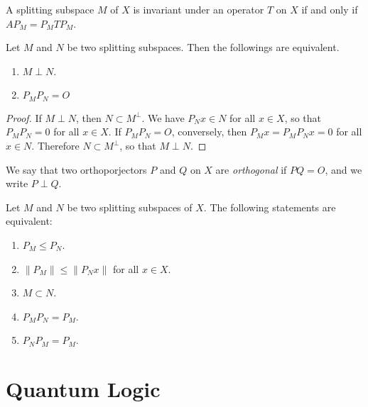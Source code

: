 \begin{lemma}
A splitting subspace \(M\) of \(X\) is invariant under an operator \(T\) on \(X\) if and only if \(AP_M=P_MTP_M\).
\end{lemma}
\begin{lemma}
Let \(M\) and \(N\) be two splitting subspaces. Then the followings are equivalent.
\begin{enumerate}
    \item \(M \perp N\).
    \item \(P_M P_N = O\)
\end{enumerate}
\begin{proof}
    If \(M\perp N\), then \(N \subset M^\perp\). We have \(P_Nx \in N\) for all \(x \in X\), so that \(P_MP_N=0\) for all \(x \in X\). If \(P_M P_N=O\), conversely, then \(P_Mx=P_M P_N x =0\) for all \(x \in N\). Therefore \(N \subset M^\perp\), so that \(M\perp N\).
\end{proof}
\end{lemma}
We say that two orthoporjectors \(P\) and \(Q\) on \(X\) are \emph{orthogonal} if \(PQ=O\), and we write \(P\perp Q\).
\begin{lemma}
    Let \(M\) and \(N\) be two splitting subspaces of \(X\). The following statements are equivalent:
    \begin{enumerate}
        \item \(P_M \le P_N\).
        \item \(\left \lVert P_M \right \rVert \le \left \lVert P_Nx \right \rVert\) for all \(x \in X\).
        \item \(M \subset N\).
        \item \(P_M P_N = P_M\).
        \item \(P_N P_M = P_M\).
    \end{enumerate}
\end{lemma}

\section{Quantum Logic}

